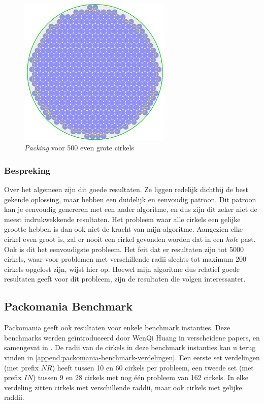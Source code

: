 \documentclass[12pt,a4paper,oneside]{book}
\begin{document}
{\begin{figure}
  \centering
  \includegraphics[width=0.65\textwidth]{packing-even-groot-500.png}
  \caption{\textit{Packing} voor 500 even grote cirkels} \label{fig:packing-even-groot-500} 
\end{figure}

\subsubsection{Bespreking} %

Over het algemeen zijn dit goede resultaten.
Ze liggen redelijk dichtbij de best gekende oplossing, maar hebben een duidelijk en eenvoudig patroon.
Dit patroon kan je eenvoudig genereren met een ander algoritme, en dus zijn dit zeker niet de meest indrukwekkende resultaten.
Het probleem waar alle cirkels een gelijke grootte hebben is dan ook niet de kracht van mijn algoritme.
Aangezien elke cirkel even groot is, zal er nooit een cirkel gevonden worden dat in een \textit{hole} past.
Ook is dit het eenvoudigste probleem.
Het feit dat er resultaten zijn tot 5000 cirkels, waar voor problemen met verschillende radii slechts tot maximum 200 cirkels opgelost zijn, wijst hier op.
Hoewel mijn algoritme dus relatief goede resultaten geeft voor dit probleem, zijn de resultaten die volgen interessanter.

\subsection{Packomania Benchmark}

Packomania geeft ook resultaten voor enkele benchmark instanties. Deze benchmarks werden geïntroduceerd door WenQi Huang in verscheidene papers, en samengevat in \cite{huang2006new}.
De radii van de cirkels in deze benchmark instanties kan u terug vinden in \autoref{append:packomania-benchmark-verdelingen}.
Een eerste set verdelingen (met prefix $NR$) heeft tussen 10 en 60 cirkels per probleem, een tweede set (met prefix $IN$) tussen 9 en 28 cirkels met nog één probleem van 162 cirkels.
In elke verdeling zitten cirkels met verschillende raddii, maar ook cirkels met gelijke raddii.

}
\end{document}
